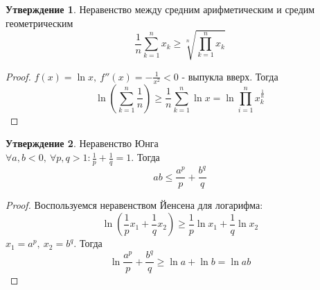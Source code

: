 \documentclass[a4paper, 12pt]{article}
\theoremstyle{definition}
\newtheorem*{statement}{Утверждение}
\begin{document}
        \begin{statement}
            Неравенство между средним арифметическим и средим геометрическим\\
            \[\frac{1}{n}\sum\limits_{k=1}^{n}x_k\geq \sqrt[n]{\prod\limits_{k=1}^{n}x_k}\]
        \end{statement}
        \begin{proof}
            $f(x)=\ln{x},\ f''(x)=-\frac{1}{x^2}<0$ - выпукла вверх. Тогда
            \[\ln({\sum\limits_{k=1}^{n}\frac{1}{n}})\geq \frac{1}{n} \sum\limits_{k=1}^{n}\ln{x}=\ln{\prod\limits_{i=1}^{n}x_k^{\frac{1}{n}}}\]
        \end{proof} 
        \begin{statement}
            Неравенство Юнга\\
            $\forall a,b<0,\ \forall p,q>1: \frac{1}{p}+\frac{1}{q}=1$. Тогда 
            \[ab\leq \frac{a^p}{p}+\frac{b^q}{q}\]
        \end{statement}
        \begin{proof}
            Воспользуемся неравенством Йенсена для логарифма:
            \[\ln({\frac{1}{p}x_1+\frac{1}{q}x_2})\geq \frac{1}{p}\ln{x_1}+\frac{1}{q}\ln{x_2}\]
            $x_1=a^p,\ x_2=b^q$. Тогда
            \[\ln{\frac{a^p}{p}+\frac{b^q}{q}}\geq \ln{a}+\ln{b}=\ln{ab}\]
        \end{proof} 
\end{document}
